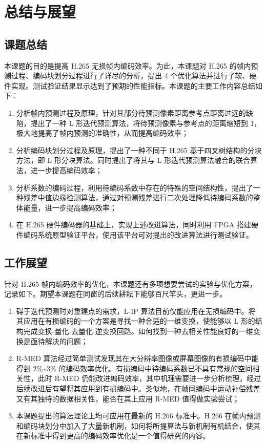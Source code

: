 \chapter{总结与展望}
\label{cha:c6}

\section{课题总结}
本课题的目的是提高 H.265 无损帧内编码效率。为此，本课题对 H.265 的帧内预测过程、编码块划分过程进行了详尽的分析，提出 4 个优化算法并进行了软、硬件实现。测试验证结果显示达到了预期的性能指标。本课题的主要工作内容总结如下：
\begin{enumerate}
    \item 分析帧内预测过程及原理，针对其部分待预测像素距离参考点距离过远的缺陷，提出了一种 L 形迭代预测算法，将待预测像素与参考点的距离缩短到 1，极大地提高了帧内预测的准确性，从而提高编码效率；
    \item 分析编码块划分过程及原理，提出了一种不同于 H.265 基于四叉树结构的分块方法，即 L 形分块算法。同时提出了将其与 L 形迭代预测算法融合的联合算法，进一步提高编码效率；
    \item 分析系数的编码过程，利用待编码系数中存在的特殊的空间结构性，提出了一种残差中值边缘检测算法，通过对预测残差进行二次处理降低待编码系数的整体能量，进一步提高编码效率；
    \item 在 H.265 硬件编码器的基础上，实现上述改进算法，同时利用 FPGA 搭建硬件编码系统原型验证平台，使用该平台可对提出的改进算法进行测试验证。
\end{enumerate}

\section{工作展望}
针对 H.265 帧内编码效率的优化，本课题还有多项想要尝试的实验与优化方案，记录如下。期望本课题在同窗的后续耕耘下能够百尺竿头，更进一步。
\begin{enumerate}
    \item 碍于迭代预测时对重建点的需求，L-IP 算法目前仅能应用在无损编码中。将其应用在有损编码的一个方案是寻找一种合适的一维变换，使能够以 L 形的结构完成变换-量化-去量化-逆变换回路。如何找到一种去相关性能良好的一维变换是亟待解决的问题；
    \item R-MED 算法经过简单测试发现其在大分辨率图像或屏幕图像的有损编码中能得到 2\%\textasciitilde 3\% 的编码效率优化。有损编码中待编码系数已不具有常规的空间相关性，此时 R-MED 仍能改进编码效率，其中机理需要进一步分析梳理，经过后续改进后有望将其应用到有损编码中。类似地，在帧间编码中运动补偿残差又有其独特的数据相关性，能否在其上应用 R-MED 值得做实验尝试；
    \item 本课题提出的算法理论上均可应用在最新的 H.266 标准中。H.266 在帧内预测和编码块划分中加入了大量新机制，如何将所提算法与新机制有机结合，使其在新标准中得到更高的编码效率优化是一个值得研究的内容。
\end{enumerate}